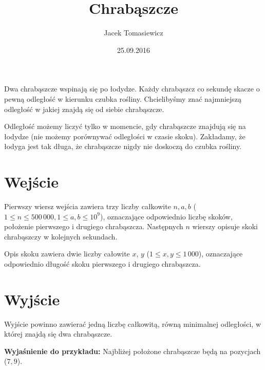 \documentclass[zad,zawodnik,utf8]{sinol}
\title{Chrabąszcze}
\author{Jacek Tomasiewicz}
\date{25.09.2016}
\begin{document}
  \begin{tasktext}%
Dwa chrabąszcze wspinają się po łodydze. Każdy chrabąszcz co sekundę skacze o pewną  odległość w kierunku czubka rośliny. Chcielibyśmy znać najmniejszą odległość w jakiej znajdą się od siebie chrabąszcze.

Odległość możemy liczyć tylko w  momencie, gdy chrabąszcze znajdują się na łodydze (nie możemy porównywać odległości w czasie skoku). Zakładamy, że łodyga jest tak długa, że chrabąszcze nigdy nie doskoczą do czubka  rośliny.

  \section{Wejście}
	Pierwszy wiersz wejścia zawiera trzy liczby całkowite $n, a, b$ ($1 \leq n \leq  500\,000, 1 \leq a, b \leq 10^9$), oznaczające odpowiednio liczbę skoków, położenie  pierwszego i drugiego chrabąszcza. Następnych $n$ wierszy opisuje skoki chrabąszczy w  kolejnych sekundach.

Opis skoku zawiera dwie liczby całowite $x$, $y$ ($1 \leq x, y \leq 1\,000$), oznaczające odpowiednio długość skoku  pierwszego i drugiego chrabąszcza.

  \section{Wyjście}
Wyjście powinno zawierać jedną liczbę całkowitą, równą minimalnej odległości, w której  znajdą się dwa chrabąszcze.

     \makecompactexample

\medskip
\noindent
\textbf{Wyjaśnienie do przykładu:} Najbliżej położone chrabąszcze będą na pozycjach ($7,9$).

  \end{tasktext}
\end{document}

